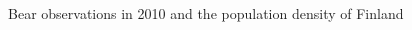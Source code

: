 \documentclass[12pt,a4paper,oneside,article]{memoir}
\begin{document}
\begin{figure}[htbp]
  \begin{adjustwidth}{-2in}{-2in}
	  \centering
  \end{adjustwidth}
  \caption{Bear observations in 2010 and the population density of Finland}
  \label{fig:bw2010}
\end{figure}
\end{document}
